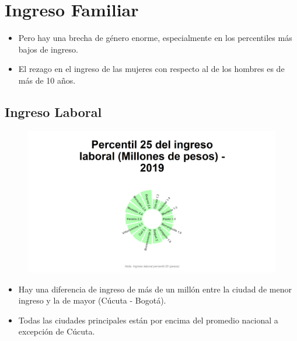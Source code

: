 


\section{Ingreso Familiar}

    \begin{tcolorbox}[enhanced, colback=mycolor,colframe=mycolor,drop fuzzy shadow,watermark color=white,
                        title=Principales Resultados]
    

                    \begin{itemize}
                    \item Pero hay una brecha de género enorme, especialmente en los percentiles más bajos de ingreso.
                    \item El rezago en el ingreso de las mujeres con respecto al de los hombres es de más de 10 años.
                \end{itemize}
     
     
    \end{tcolorbox}



    \subsection{Ingreso Laboral}
    \begin{figure}[H]
    \caption[Percentil 25 del ingreso laboral por ciudades principales - 2019]{\label{ingreso_laboral_25_ciudades}}
        \begin{center}
        \includegraphics[width=\textwidth,keepaspectratio]{img/var_2_static.png}
        \end{center}
    \end{figure}
            \begin{itemize}
                    \item Hay una diferencia de ingreso de más de un millón entre la ciudad de menor ingreso y la de mayor (Cúcuta -  Bogotá).
                    \item Todas las ciudades principales están por encima del promedio nacional a excepción de Cúcuta.
                \end{itemize}

